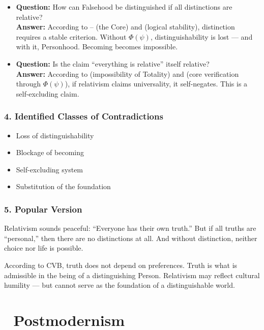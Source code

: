 \documentclass[12pt]{article}
\begin{document}
\begin{itemize}
\item \textbf{Question:} How can Falsehood be distinguished if all distinctions are relative?  
\\ \textbf{Answer:} According to \text{[1]}–\text{[3]} (the Core) and \text{[11.1]} (logical stability), distinction requires a stable criterion. Without $\Phi(\psi)$, distinguishability is lost — and with it, Personhood. Becoming becomes impossible.

\item \textbf{Question:} Is the claim ``everything is relative'' itself relative?  
\\ \textbf{Answer:} According to \text{[2]} (impossibility of Totality) and \text{[11.1.1.2]} (core verification through $\Phi(\psi)$), if relativism claims universality, it self-negates. This is a self-excluding claim.
\end{itemize}

\subsubsection*{4. Identified Classes of Contradictions}

\begin{itemize}
\item Loss of distinguishability
\item Blockage of becoming
\item Self-excluding system
\item Substitution of the foundation
\end{itemize}

\subsubsection*{5. Popular Version}

Relativism sounds peaceful: ``Everyone has their own truth.'' But if all truths are ``personal,'' then there are no distinctions at all. And without distinction, neither choice nor life is possible.

According to CVB, truth does not depend on preferences. Truth is what is admissible in the being of a distinguishing Person. Relativism may reflect cultural humility — but cannot serve as the foundation of a distinguishable world.

\section*{🔷 Postmodernism}
\end{document}

